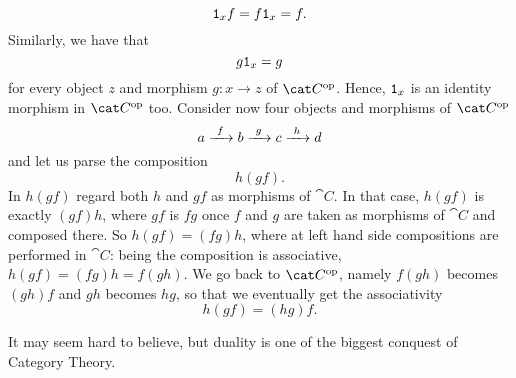 \[\mathtt 1_x f = f \mathtt 1_x = f .\]
Similarly, we have that
\[g \mathtt 1_x  = g\]
for every object \(z\) and morphism \(g : x \to z\) of \(\op{\cat C}\). Hence, \(\mathtt 1_x\) is an identity morphism in \(\op{\cat C}\) too. Consider now four objects and morphisms of \(\op{\cat C}\)
\[a \xrightarrow{\ f\ } b \xrightarrow{\ g\ } c \xrightarrow{\ h\ } d\]
and let us parse the composition
\[h(gf) .\]
In \(h(gf)\) regard both \(h\) and \(gf\) as morphisms of \(\cat C\). In that case, \(h(gf)\) is exactly \((gf)h\), where \(gf\) is \(fg\) once \(f\) and \(g\) are taken as morphisms of \(\cat C\) and composed there. So \(h(gf) = (fg)h\), where at left hand side compositions are performed in \(\cat C\): being the composition is associative, \(h(gf) = (fg)h = f(gh)\). We go back to \(\op{\cat C}\), namely \(f(gh)\) becomes \((gh)f\) and \(gh\) becomes \(hg\), so that we eventually get the associativity
\[h(gf) = (hg) f .\]

It may seem hard to believe, but duality is one of the biggest conquest of Category Theory. \NotaInterna{\dots{}}

